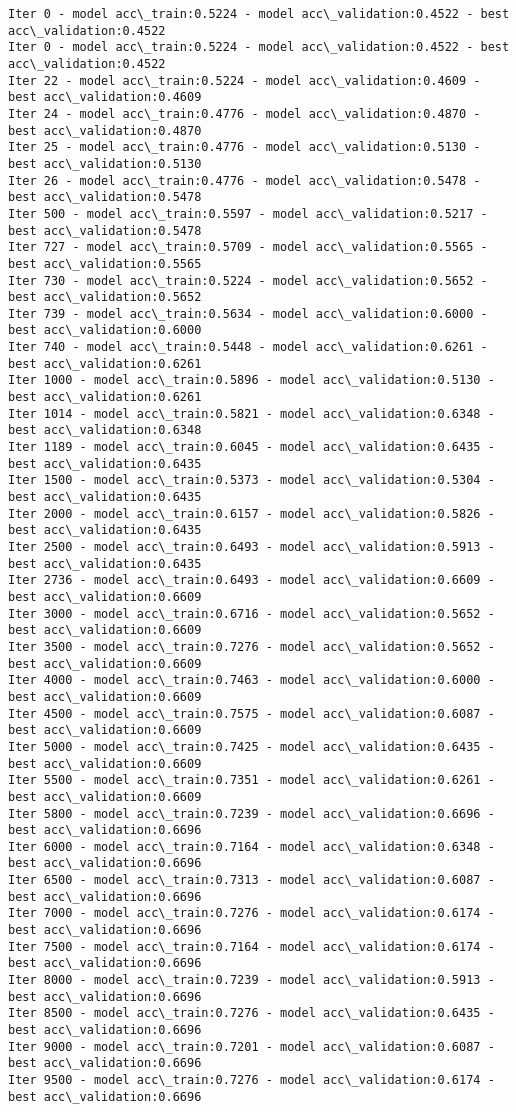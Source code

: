 \documentclass[11pt]{article}
\begin{document}
    \begin{Verbatim}[commandchars=\\\{\}]
Iter 0 - model acc\_train:0.5224 - model acc\_validation:0.4522 - best acc\_validation:0.4522
Iter 0 - model acc\_train:0.5224 - model acc\_validation:0.4522 - best acc\_validation:0.4522
Iter 22 - model acc\_train:0.5224 - model acc\_validation:0.4609 - best acc\_validation:0.4609
Iter 24 - model acc\_train:0.4776 - model acc\_validation:0.4870 - best acc\_validation:0.4870
Iter 25 - model acc\_train:0.4776 - model acc\_validation:0.5130 - best acc\_validation:0.5130
Iter 26 - model acc\_train:0.4776 - model acc\_validation:0.5478 - best acc\_validation:0.5478
Iter 500 - model acc\_train:0.5597 - model acc\_validation:0.5217 - best acc\_validation:0.5478
Iter 727 - model acc\_train:0.5709 - model acc\_validation:0.5565 - best acc\_validation:0.5565
Iter 730 - model acc\_train:0.5224 - model acc\_validation:0.5652 - best acc\_validation:0.5652
Iter 739 - model acc\_train:0.5634 - model acc\_validation:0.6000 - best acc\_validation:0.6000
Iter 740 - model acc\_train:0.5448 - model acc\_validation:0.6261 - best acc\_validation:0.6261
Iter 1000 - model acc\_train:0.5896 - model acc\_validation:0.5130 - best acc\_validation:0.6261
Iter 1014 - model acc\_train:0.5821 - model acc\_validation:0.6348 - best acc\_validation:0.6348
Iter 1189 - model acc\_train:0.6045 - model acc\_validation:0.6435 - best acc\_validation:0.6435
Iter 1500 - model acc\_train:0.5373 - model acc\_validation:0.5304 - best acc\_validation:0.6435
Iter 2000 - model acc\_train:0.6157 - model acc\_validation:0.5826 - best acc\_validation:0.6435
Iter 2500 - model acc\_train:0.6493 - model acc\_validation:0.5913 - best acc\_validation:0.6435
Iter 2736 - model acc\_train:0.6493 - model acc\_validation:0.6609 - best acc\_validation:0.6609
Iter 3000 - model acc\_train:0.6716 - model acc\_validation:0.5652 - best acc\_validation:0.6609
Iter 3500 - model acc\_train:0.7276 - model acc\_validation:0.5652 - best acc\_validation:0.6609
Iter 4000 - model acc\_train:0.7463 - model acc\_validation:0.6000 - best acc\_validation:0.6609
Iter 4500 - model acc\_train:0.7575 - model acc\_validation:0.6087 - best acc\_validation:0.6609
Iter 5000 - model acc\_train:0.7425 - model acc\_validation:0.6435 - best acc\_validation:0.6609
Iter 5500 - model acc\_train:0.7351 - model acc\_validation:0.6261 - best acc\_validation:0.6609
Iter 5800 - model acc\_train:0.7239 - model acc\_validation:0.6696 - best acc\_validation:0.6696
Iter 6000 - model acc\_train:0.7164 - model acc\_validation:0.6348 - best acc\_validation:0.6696
Iter 6500 - model acc\_train:0.7313 - model acc\_validation:0.6087 - best acc\_validation:0.6696
Iter 7000 - model acc\_train:0.7276 - model acc\_validation:0.6174 - best acc\_validation:0.6696
Iter 7500 - model acc\_train:0.7164 - model acc\_validation:0.6174 - best acc\_validation:0.6696
Iter 8000 - model acc\_train:0.7239 - model acc\_validation:0.5913 - best acc\_validation:0.6696
Iter 8500 - model acc\_train:0.7276 - model acc\_validation:0.6435 - best acc\_validation:0.6696
Iter 9000 - model acc\_train:0.7201 - model acc\_validation:0.6087 - best acc\_validation:0.6696
Iter 9500 - model acc\_train:0.7276 - model acc\_validation:0.6174 - best acc\_validation:0.6696


\end{Verbatim}
\end{document}

